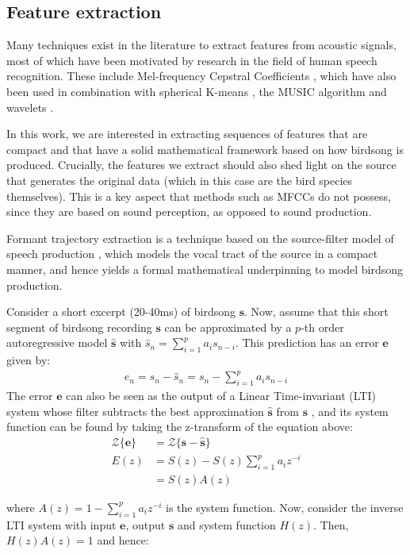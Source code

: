 \documentclass[pdftex,11pt,a4paper]{article}
\theoremstyle{definition}
\theoremstyle{remark}
\newcommand*{\V}[1]{\mathbf{#1}}%
\begin{document}
\subsection{Feature extraction}
Many techniques exist in the literature to extract features from acoustic signals, most of which have been motivated by research in the field of human speech recognition. These include Mel-frequency Cepstral Coefficients \cite{Jurafsky2009, Chou2008a, Stowell2014, Gutierrez-Osuna2009}, which have also been used in combination with spherical K-means \cite{Stowell2014}, the MUSIC algorithm \cite{Evans, Kootsookos1999} and wavelets \cite{Gamulkiewicz2003, Chou2009}.
\par In this work, we are interested in extracting sequences of features that are compact and that have a solid mathematical framework based on how birdsong is produced. Crucially, the features we extract should also shed light on the source that generates the original data (which in this case are the bird species themselves). This is a key aspect that methods such as MFCCs do not possess, since they are based on sound perception, as opposed to sound production.
\par Formant trajectory extraction is a technique based on the source-filter model of speech production \cite{Snell1993}, which models the vocal tract of the source in a compact manner, and hence yields a formal mathematical underpinning to model birdsong production.
\par Consider a short excerpt (20-40ms) of birdsong $\V{s}$. Now, assume that this short segment of birdsong recording $\V{s}$ can be approximated by a $p$-th order autoregressive model $\hat{\V{s}}$ with $\hat{s}_n = \sum_{i=1}^pa_is_{n-i}$. This prediction has an error $\V{e}$ given by:
\begin{align*}
e_n = s_n - \hat{s}_n = s_n - \sum_{i=1}^pa_is_{n-i}
\end{align*}
The error $\V{e}$ can also be seen as the output of a Linear Time-invariant (LTI) system whose filter subtracts the best approximation $\hat{\V{s}}$ from $\V{s}$ \cite{Bello}, and its system function can be found by taking the z-transform of the equation above: 
\begin{align*}
\mathcal{Z}\{\V{e}\} &= \mathcal{Z}\{\V{s} - \hat{\V{s}}\}\\
E(z) &= S(z) - S(z)\sum_{i=1}^pa_iz^{-i}\\
 &= S(z)A(z)
\end{align*}
\par where $A(z) = 1 - \sum_{i=1}^pa_iz^{-i}$ is the system function. Now, consider the inverse LTI system with input $\V{e}$, output $\V{s}$ and system function $H(z)$. Then, $H(z)A(z) = 1$ and hence:
\end{document}
